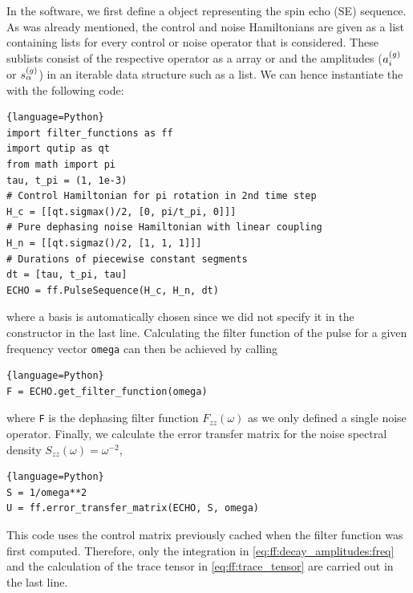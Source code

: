 In the software, we first define a \pulsesequence object representing the spin echo (SE) sequence.
As was already mentioned, the control and noise Hamiltonians are given as a list containing lists for every control or noise operator that is considered.
These sublists consist of the respective operator as a \numpy array or \qutip \qobj and the amplitudes ($a_i^{(g)}$ or $s_\alpha^{(g)}$) in an iterable data structure such as a list.
We can hence instantiate the \pulsesequence with the following code:
\begin{lstlisting}{language=Python}
import filter_functions as ff
import qutip as qt
from math import pi
tau, t_pi = (1, 1e-3)
# Control Hamiltonian for pi rotation in 2nd time step
H_c = [[qt.sigmax()/2, [0, pi/t_pi, 0]]]
# Pure dephasing noise Hamiltonian with linear coupling
H_n = [[qt.sigmaz()/2, [1, 1, 1]]]
# Durations of piecewise constant segments
dt = [tau, t_pi, tau]
ECHO = ff.PulseSequence(H_c, H_n, dt)
\end{lstlisting}
where a basis is automatically chosen since we did not specify it in the constructor in the last line.
Calculating the filter function of the pulse for a given frequency vector \verb|omega| can then be achieved by calling
\begin{lstlisting}{language=Python}
F = ECHO.get_filter_function(omega)
\end{lstlisting}
where \verb|F| is the dephasing filter function $F_{zz}(\omega)$ as we only defined a single noise operator.
Finally, we calculate the error transfer matrix \liouvUe for the noise spectral density $S_{zz}(\omega) = \omega^{-2}$,
\begin{lstlisting}{language=Python}
S = 1/omega**2
U = ff.error_transfer_matrix(ECHO, S, omega)
\end{lstlisting}
This code uses the control matrix previously cached when the filter function was first computed.
Therefore, only the integration in \cref{eq:ff:decay_amplitudes:freq} and the calculation of the trace tensor in \cref{eq:ff:trace_tensor} are carried out in the last line.


